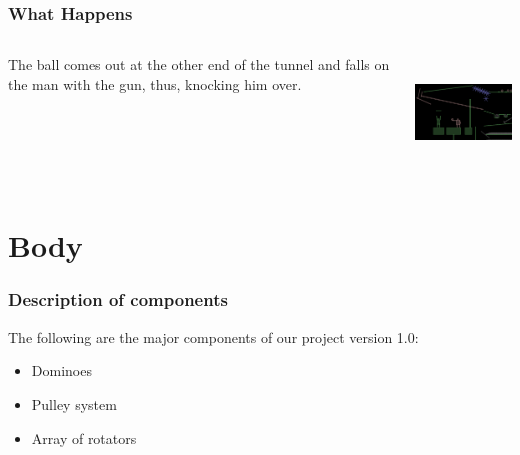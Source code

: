 \begin{frame}
\frametitle{What Happens}
\begin{columns}
\begin{column}{.7\textwidth}
\begin{scriptsize}
The ball comes out at the other end of the tunnel and falls on the man with the gun, thus, knocking him over.
\end{scriptsize}
\end{column}
\pause
\begin{column}{.4\textwidth}
\includegraphics[width=4.5cm,height=3cm]{wh6}
\end{column}
\end{columns}
\end{frame}



\section{Body}

\begin{frame}
\frametitle{Description of components}
The following are the major components of our project version 1.0:
\begin{itemize}
\item Dominoes \pause
\item Pulley system \pause
\item Array of rotators
\end{itemize}
\end{frame}


